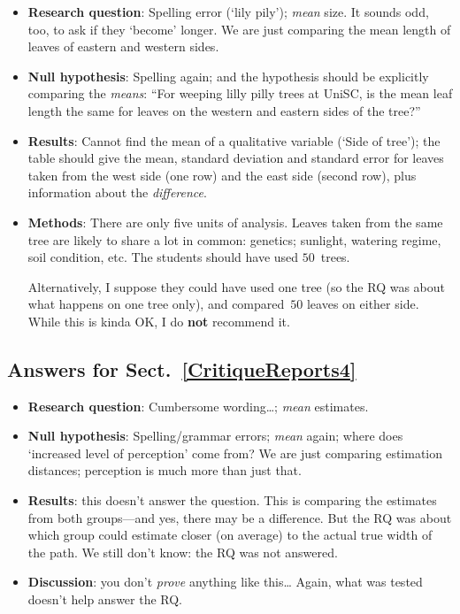 \documentclass[
  11pt,
  a4paper,
  krantz2]{krantz}
\providecommand{\tightlist}{%
  \setlength{\itemsep}{0pt}\setlength{\parskip}{0pt}}
\begin{document}
\begin{footnotesize}
\begin{itemize}
\item
  \textbf{Research question}: Spelling error (`lily pily'); \emph{mean} size.
  It sounds odd, too, to ask if they `become' longer.
  We are just comparing the mean length of leaves of eastern and western sides.
\item
  \textbf{Null hypothesis}: Spelling again; and the hypothesis should be explicitly comparing the \emph{means}:
  ``For weeping lilly pilly trees at UniSC, is the mean leaf length the same for leaves on the western and eastern sides of the tree?''
\item
  \textbf{Results}: Cannot find the mean of a qualitative variable (`Side of tree'); the table should give the mean, standard deviation and standard error for leaves taken from the west side (one row) and the east side (second row), plus information about the \emph{difference}.
\item
  \textbf{Methods}: There are only five units of analysis.
  Leaves taken from the same tree are likely to share a lot in common: genetics; sunlight, watering regime, soil condition, etc.
  The students should have used \(50\)~trees.

  Alternatively, I suppose they could have used one tree (so the RQ was about what happens on one tree only), and compared~\(50\) leaves on either side.
  While this is kinda OK, I do \textbf{not} recommend it.
\end{itemize}

\subsection*{Answers for Sect.~\ref{CritiqueReports4}}\label{answers-for-sect.-refcritiquereports4}

\begin{itemize}
\tightlist
\item
  \textbf{Research question}: Cumbersome wording\ldots; \emph{mean} estimates.
\item
  \textbf{Null hypothesis}: Spelling/grammar errors; \emph{mean} again; where does `increased level of perception' come from?
  We are just comparing estimation distances; perception is much more than just that.
\item
  \textbf{Results}: this doesn't answer the question.
  This is comparing the estimates from both groups---and yes, there may be a difference.
  But the RQ was about which group could estimate closer (on average) to the actual true width of the path.
  We still don't know: the RQ was not answered.
\item
  \textbf{Discussion}: you don't \emph{prove} anything like this\ldots{}
  Again, what was tested doesn't help answer the RQ.
\end{itemize}


\end{footnotesize}
\end{document}
